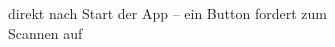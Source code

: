 \begin{figure}[ht]
	\centering
	\begin{subfigure}[b]{0.45\textwidth}
		\caption{direkt nach Start der App -- ein Button fordert zum Scannen auf}
		\label{img:barcoo-1}
	\end{subfigure}
	~
	\begin{subfigure}[b]{0.45\textwidth}

\end{subfigure}
\end{figure}
